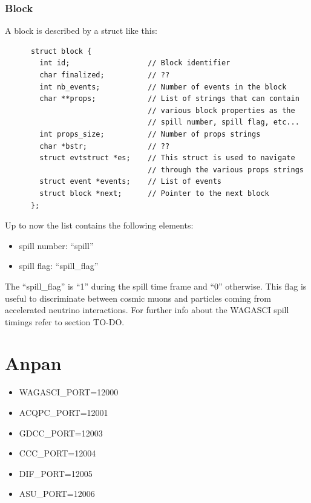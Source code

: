 \subsubsection{Block}
A block is described by a struct like this:
\begin{lstlisting}
      struct block {
        int id;                  // Block identifier
        char finalized;          // ??
        int nb_events;           // Number of events in the block
        char **props;            // List of strings that can contain
                                 // various block properties as the
                                 // spill number, spill flag, etc...
        int props_size;          // Number of props strings
        char *bstr;              // ??
        struct evtstruct *es;    // This struct is used to navigate
                                 // through the various props strings
        struct event *events;    // List of events
        struct block *next;      // Pointer to the next block
      };
\end{lstlisting}
Up to now the  list contains the following elements:
\begin{itemize}
\item spill number: ``spill''
\item spill flag: ``spill\_flag''
\end{itemize}

The ``spill\_flag'' is ``1'' during the spill time frame and ``0''
otherwise. This flag is useful to discriminate between cosmic muons
and particles coming from accelerated neutrino interactions.  For
further info about the WAGASCI spill timings refer to section TO-DO.

\section{Anpan}
\begin{itemize}
\item WAGASCI\_PORT=12000
\item ACQPC\_PORT=12001
\item GDCC\_PORT=12003
\item CCC\_PORT=12004
\item DIF\_PORT=12005
\item ASU\_PORT=12006
\end{itemize}



